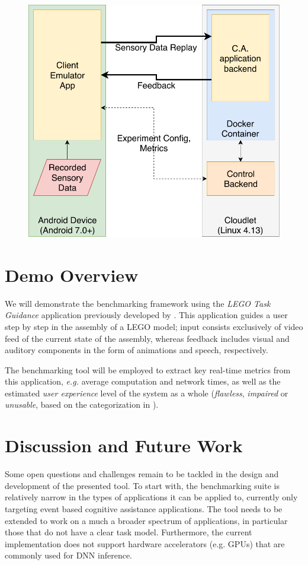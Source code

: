 \begin{figure}
  \centering
  \includegraphics[width=.7\columnwidth]{img/TraceReplay_GenArch}
  \label{fig:TraceReplayArch}
\end{figure}

\section{Demo Overview}

We will demonstrate the benchmarking framework using the \emph{LEGO Task Guidance} application previously developed by \textcite{Chen:EarlyImplementation}.
This application guides a user step by step in the assembly of a LEGO model; input consists exclusively of video feed of the current state of the assembly, whereas feedback includes visual and auditory components in the form of animations and speech, respectively.

The benchmarking tool will be employed to extract key real-time metrics from this application, \emph{e.g.} average computation and network times, as well as the estimated \emph{user experience} level of the system as a whole (\emph{flawless}, \emph{impaired} or \emph{unusable}, based on the categorization in \cite{Chen:AnEmpiricalStudyOfLatency}).

\section{Discussion and Future Work}

Some open questions and challenges remain to be tackled in the design and development of the presented tool.
To start with, the benchmarking suite is relatively narrow in the types of applications it can be applied to, currently only targeting event based cognitive assistance applications.
The tool needs to be extended to work on a much a broader spectrum of applications, in particular those that do not have a clear task model.
Furthermore, the current implementation does not support hardware accelerators (e.g. GPUs) that are commonly used for DNN inference.

